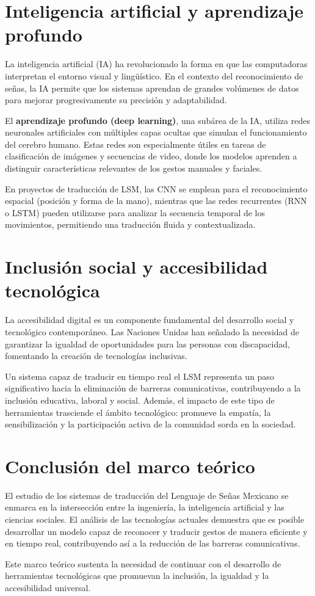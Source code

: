 \documentclass[12pt, oneside]{report}
\begin{document}
\section{Inteligencia artificial y aprendizaje profundo}
La inteligencia artificial (IA) ha revolucionado la forma en que las computadoras interpretan el entorno visual y lingüístico. En el contexto del reconocimiento de señas, la IA permite que los sistemas aprendan de grandes volúmenes de datos para mejorar progresivamente su precisión y adaptabilidad.

El \textbf{aprendizaje profundo (deep learning)}, una subárea de la IA, utiliza redes neuronales artificiales con múltiples capas ocultas que simulan el funcionamiento del cerebro humano. Estas redes son especialmente útiles en tareas de clasificación de imágenes y secuencias de video, donde los modelos aprenden a distinguir características relevantes de los gestos manuales y faciales.

En proyectos de traducción de LSM, las CNN se emplean para el reconocimiento espacial (posición y forma de la mano), mientras que las redes recurrentes (RNN o LSTM) pueden utilizarse para analizar la secuencia temporal de los movimientos, permitiendo una traducción fluida y contextualizada.

\section{Inclusión social y accesibilidad tecnológica}
La accesibilidad digital es un componente fundamental del desarrollo social y tecnológico contemporáneo. Las Naciones Unidas han señalado la necesidad de garantizar la igualdad de oportunidades para las personas con discapacidad, fomentando la creación de tecnologías inclusivas.

Un sistema capaz de traducir en tiempo real el LSM representa un paso significativo hacia la eliminación de barreras comunicativas, contribuyendo a la inclusión educativa, laboral y social. Además, el impacto de este tipo de herramientas trasciende el ámbito tecnológico: promueve la empatía, la sensibilización y la participación activa de la comunidad sorda en la sociedad.

\section{Conclusión del marco teórico}
El estudio de los sistemas de traducción del Lenguaje de Señas Mexicano se enmarca en la intersección entre la ingeniería, la inteligencia artificial y las ciencias sociales. El análisis de las tecnologías actuales demuestra que es posible desarrollar un modelo capaz de reconocer y traducir gestos de manera eficiente y en tiempo real, contribuyendo así a la reducción de las barreras comunicativas.

Este marco teórico sustenta la necesidad de continuar con el desarrollo de herramientas tecnológicas que promuevan la inclusión, la igualdad y la accesibilidad universal.





\end{document}
